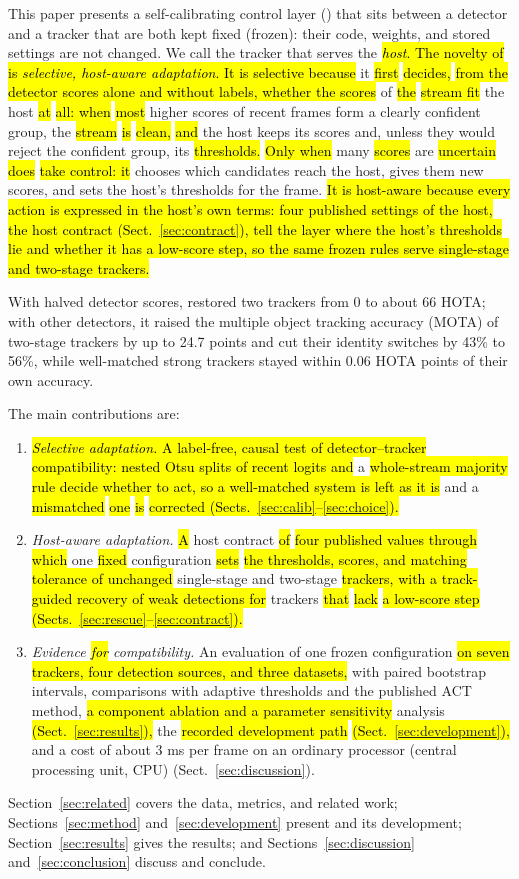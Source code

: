 This paper presents a self-calibrating control layer (\scl{}) that sits between a detector and a
tracker that are both kept fixed (frozen): their code, weights, and stored settings are not
changed. We call the tracker that \scl{} serves the \hl{\emph{host}. The novelty of \scl{} is
\emph{selective, host-aware adaptation}. It is selective because} it \hl{first} \hl{decides,} \hl{from the
detector scores alone and without labels, whether the scores} of \hl{the} \hl{stream fit} the host \hl{at} \hl{all:
when} \hl{most} higher scores of recent frames form a clearly confident group, the \hl{stream} \hl{is} \hl{clean,} \hl{and}
the host keeps its scores and, unless they would reject the confident group, its \hl{thresholds.} \hl{Only
when} many \hl{scores} are \hl{uncertain does} \scl{} \hl{take control: it} chooses which candidates reach the
host, gives them new scores, and sets the host's thresholds for the frame. \hl{It is host-aware because
every action is expressed in the host's own terms: four published settings of the host, the host
contract (Sect.~\ref{sec:contract}), tell the layer where the host's thresholds lie and whether it
has a low-score step, so the same frozen rules serve single-stage and two-stage trackers.}

With halved detector scores, \scl{} restored two trackers from 0 to about 66 HOTA; with other
detectors, it raised the multiple object tracking accuracy (MOTA) of two-stage trackers by up to
24.7 points and cut their identity switches by 43\% to 56\%, while well-matched strong trackers
stayed within 0.06 HOTA points of their own accuracy.

The main contributions are:
\begin{enumerate}
\item \hl{\emph{Selective adaptation.} A label-free, causal test of detector--tracker compatibility:
      nested Otsu splits of recent logits and} a \hl{whole-stream majority rule decide whether to act,
      so a well-matched system is left as it is} and a \hl{mismatched} \hl{one} \hl{is} \hl{corrected
      (Sects.~\ref{sec:calib}--\ref{sec:choice}).}
\item \emph{Host-aware adaptation.} \hl{A} host contract \hl{of} \hl{four published values through which} one
      \hl{fixed} configuration \hl{sets} \hl{the thresholds, scores, and matching tolerance of unchanged}
      single-stage and two-stage \hl{trackers, with a track-guided recovery of weak detections for}
      trackers \hl{that} \hl{lack} \hl{a low-score step (Sects.~\ref{sec:rescue}--\ref{sec:contract}).}
\item \emph{Evidence \hl{for} compatibility.} An evaluation of one frozen configuration \hl{on seven
      trackers, four detection sources, and three datasets,} with paired bootstrap intervals,
      comparisons with adaptive thresholds and the published ACT method, \hl{a component ablation and a
      parameter sensitivity} analysis \hl{(Sect.~\ref{sec:results}),} the \hl{recorded development path}
      \hl{(Sect.~\ref{sec:development}),} and a cost of about 3 ms per frame on an ordinary processor
      (central processing unit, CPU) (Sect.~\ref{sec:discussion}).
\end{enumerate}

Section~\ref{sec:related} covers the data, metrics, and related work;
Sections~\ref{sec:method} and~\ref{sec:development} present \scl{} and its development;
Section~\ref{sec:results} gives the results; and Sections~\ref{sec:discussion}
and~\ref{sec:conclusion} discuss and conclude.
